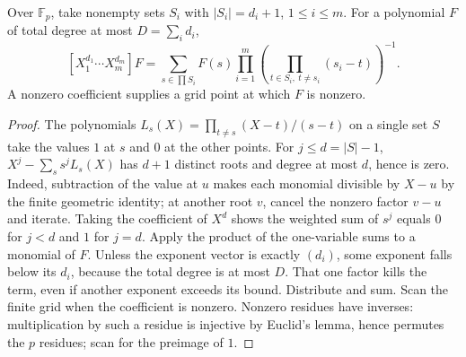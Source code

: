 \begin{lemma}\label{result60}\label{lem:grid}
Over $\mathbb F_p$, take nonempty sets $S_i$ with $|S_i|=d_i+1$, $1\le i\le m$. For a polynomial $F$ of total degree at most $D=\sum_i d_i$,
\[
 [X_1^{d_1}\cdots X_m^{d_m}]F=
 \sum_{s\in\prod S_i}F(s)\prod_{i=1}^m
 \left(\prod_{t\in S_i,\ t\ne s_i}(s_i-t)\right)^{-1}.
\]
A nonzero coefficient supplies a grid point at which $F$ is nonzero.
\end{lemma}
\begin{proof}
The polynomials $L_s(X)=\prod_{t\ne s}(X-t)/(s-t)$ on a single set $S$ take the values $1$ at $s$ and $0$ at the other points. For $j\le d=|S|-1$, $X^j-\sum_s s^jL_s(X)$ has $d+1$ distinct roots and degree at most $d$, hence is zero. Indeed, subtraction of the value at $u$ makes each monomial divisible by $X-u$ by the finite geometric identity; at another root $v$, cancel the nonzero factor $v-u$ and iterate. Taking the coefficient of $X^d$ shows the weighted sum of $s^j$ equals $0$ for $j<d$ and $1$ for $j=d$. Apply the product of the one-variable sums to a monomial of $F$. Unless the exponent vector is exactly $(d_i)$, some exponent falls below its $d_i$, because the total degree is at most $D$. That one factor kills the term, even if another exponent exceeds its bound. Distribute and sum. Scan the finite grid when the coefficient is nonzero. Nonzero residues have inverses: multiplication by such a residue is injective by Euclid's lemma, hence permutes the $p$ residues; scan for the preimage of $1$.
\end{proof}

